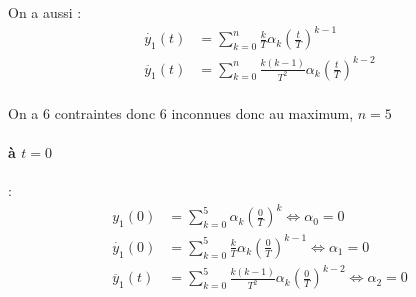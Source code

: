 \documentclass[../main.tex]{subfiles}
\begin{document}
\begin{enumerate}
\begin{enumerate}
On a aussi :
\begin{align*}
\dot{y_1}(t) &= \sum_{k=0}^n \frac{k}{T}\alpha_k \left(\frac{t}{T}\right)^{k-1}\\
\ddot{y_1}(t) &= \sum_{k=0}^n \frac{k(k-1)}{T^2}\alpha_k \left(\frac{t}{T}\right)^{k-2}\\
\end{align*}
\bigbreak

On a 6 contraintes donc 6 inconnues donc au maximum, $n=5$

\paragraph{à $t = 0$} :\\
\begin{align*}
y_1(0) &= \sum_{k=0}^5 \alpha_k \left(\frac{0}{T}\right)^k \Leftrightarrow \alpha_0 = 0\\
\dot{y_1}(0) &= \sum_{k=0}^5 \frac{k}{T}\alpha_k \left(\frac{0}{T}\right)^{k-1}  \Leftrightarrow \alpha_1 = 0\\
\ddot{y_1}(t) &= \sum_{k=0}^5 \frac{k(k-1)}{T^2}\alpha_k \left(\frac{0}{T}\right)^{k-2} \Leftrightarrow \alpha_2=0\\
\end{align*}


\end{enumerate}
\end{enumerate}
\end{document}
